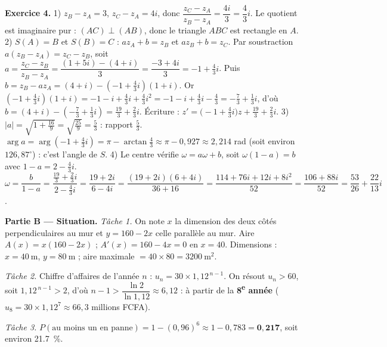 \noindent\textbf{Exercice 4.}
1) $z_B-z_A=3$, $z_C-z_A=4i$, donc $\dfrac{z_C-z_A}{z_B-z_A}=\dfrac{4i}{3}=\dfrac43 i$.
Le quotient est imaginaire pur : $(AC)\perp(AB)$, donc le triangle $ABC$ est rectangle en $A$.
2) $S(A)=B$ et $S(B)=C$ : $a z_A+b=z_B$ et $a z_B+b=z_C$. Par soustraction
$a(z_B-z_A)=z_C-z_B$, soit $a=\dfrac{z_C-z_B}{z_B-z_A}=\dfrac{(1+5i)-(4+i)}{3}=\dfrac{-3+4i}{3}=-1+\tfrac43 i$.
Puis $b=z_B-a z_A=(4+i)-(-1+\tfrac43 i)(1+i)$. Or $(-1+\tfrac43 i)(1+i)=-1-i+\tfrac43 i+\tfrac43 i^2
=-1-i+\tfrac43 i-\tfrac43=-\tfrac73+\tfrac13 i$, d'où $b=(4+i)-(-\tfrac73+\tfrac13 i)=\tfrac{19}{3}+\tfrac23 i$.
Écriture : $z'=\big(-1+\tfrac43 i\big)z+\tfrac{19}{3}+\tfrac23 i$.
3) $|a|=\sqrt{1+\tfrac{16}{9}}=\sqrt{\tfrac{25}{9}}=\tfrac53$ : rapport $\tfrac53$.
$\arg a=\arg(-1+\tfrac43 i)=\pi-\arctan\tfrac{4}{3}\approx\pi-0{,}927\approx2{,}214$ rad
(soit environ $126{,}87^\circ$) : c'est l'angle de $S$.
4) Le centre vérifie $\omega=a\omega+b$, soit $\omega(1-a)=b$ avec $1-a=2-\tfrac43 i$.
$\omega=\dfrac{b}{1-a}=\dfrac{\tfrac{19}{3}+\tfrac23 i}{2-\tfrac43 i}=\dfrac{19+2i}{6-4i}
=\dfrac{(19+2i)(6+4i)}{36+16}=\dfrac{114+76i+12i+8i^2}{52}=\dfrac{106+88i}{52}=\dfrac{53}{26}+\dfrac{22}{13}i$.

\smallskip
\noindent\textbf{Partie B — Situation.}
\emph{Tâche 1.} On note $x$ la dimension des deux côtés perpendiculaires au mur et $y=160-2x$
celle parallèle au mur. Aire $A(x)=x(160-2x)$ ; $A'(x)=160-4x=0$ en $x=40$.
Dimensions : $x=\SI{40}{\metre}$, $y=\SI{80}{\metre}$ ; aire maximale $=40\times80=\SI{3200}{\metre\squared}$.

\emph{Tâche 2.} Chiffre d'affaires de l'année $n$ : $u_n=30\times1{,}12^{\,n-1}$. On résout
$u_n>60$, soit $1{,}12^{\,n-1}>2$, d'où $n-1>\dfrac{\ln 2}{\ln 1{,}12}\approx6{,}12$ : à partir de la
\textbf{8\textsuperscript{e} année} ($u_8=30\times1{,}12^{7}\approx66{,}3$ millions FCFA).

\emph{Tâche 3.} $P(\text{au moins un en panne})=1-(0{,}96)^6\approx1-0{,}783=\mathbf{0{,}217}$,
soit environ \SI{21,7}{\percent}.
